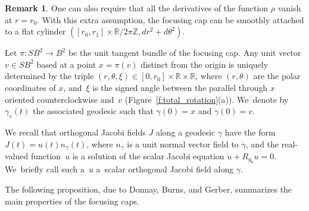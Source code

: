 \documentclass[11pt]{article}
\newcommand{\Z}{\mathbb{Z}}
\newcommand{\R}{\mathbb{R}}
\theoremstyle{plain}
\theoremstyle{definition}
\newtheorem{Remark}[Thm]{Remark}
\begin{document}
\begin{Remark}\label{r:attach_cap}
One can also require that all the derivatives of the function $\rho$ vanish at $r=r_0$. With this extra assumption, the focusing cap can be smoothly attached to a flat cylinder $([r_0,r_1]\times\R/2\pi\Z,dr^2+d\theta^2)$.
\end{Remark}

Let $\pi:SB^2\to B^2$ be the unit tangent bundle of the focusing cap. Any unit vector $v\in SB^2$ based at a point $x=\pi(v)$ distinct from the origin is uniquely determined by the triple $(r,\theta,\xi)\in[0,r_0]\times\R\times\R$, where $(r,\theta)$ are the polar coordinates of $x$, and~$\xi$ is the signed angle between the parallel through $x$ oriented counterclockwise and~$v$ (Figure~\ref{f:total_rotation}(a)). We~denote by $\gamma_v(t)$ the associated geodesic such that $\gamma(0)=x$ and $\dot\gamma(0)=v$.

We recall that orthogonal Jacobi fields $J$ along a geodesic $\gamma$ have the form $J(t)=u(t)n_\gamma(t)$, where $n_\gamma$ is a unit normal vector field to $\dot\gamma$, and the real-valued function~$u$ is a solution of the scalar Jacobi equation $\ddot u+R_{g_0} u=0$. We~briefly call such a~$u$ a~scalar orthogonal Jacobi field along $\gamma$.

The following proposition, due to Donnay, Burns, and Gerber, summarizes the main properties of the focusing caps.
\end{document}
